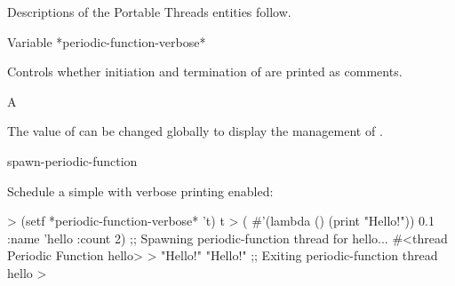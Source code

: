 \documentclass[10pt,twoside,english,pdftex]{article}
\begin{document}
\W\entities
\T{}
\T Descriptions of the Portable Threads entities follow.
\T\clearpage


\begin{functiondoc}{Variable}%
  {*periodic-function-verbose*}{}%

\fnsyntax

\fnpurpose Controls whether initiation and termination of
  are printed as comments.

\fnpackage {}

\fnmodule {}

\fnvaluetype A 

\fninitialvalue \nil

\fndescription The value of  can be
changed globally to display the management of .

\begin{alsos}{spawn-periodic-function}
\end{alsos}

%
\fnexample 
Schedule a simple  with verbose printing enabled:
%
\W\supp
\begin{example}
  > (setf *periodic-function-verbose* 't)
  t
  > ( #'(lambda () (print "Hello!")) 0.1 
      :name 'hello
      :count 2)
  ;; Spawning periodic-function thread for hello...
  #<thread Periodic Function hello>
  >
  "Hello!" 
  "Hello!" 
  ;; Exiting periodic-function thread hello
  >
\end{example}

\end{functiondoc}

\end{document}
